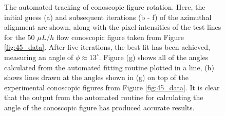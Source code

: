\begin{figure}
\begin{center}
\hspace{0.3in}
\hspace{0.3in}
\hspace{0.3in}
\end{center}
\caption[Conoscopic figure automated rotation tracking ($\phi_0=45^{\circ}$)]{\label{fig:rotation1} The automated tracking of conoscopic figure rotation. Here, the initial guess (a) and subsequent iterations (b - f) of the azimuthal alignment are shown, along with the pixel intensities of the test lines for the 50 $\mu L/h$ flow conoscopic figure taken from Figure \ref{fig:45_data}. After five iterations, the best fit has been achieved, measuring an angle of $\phi\approx13^{\circ}$. Figure (g) shows all of the angles calculated from the automated fitting routine plotted in a line, (h) shows lines drawn at the angles shown in (g) on top of the experimental conoscopic figures from Figure \ref{fig:45_data}. It is clear that the output from the automated routine for calculating the angle of the conoscopic figure has produced accurate results.}
\end{figure}

